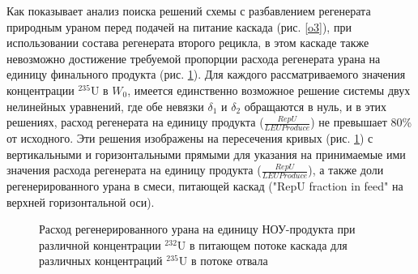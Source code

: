 Как показывает анализ поиска решений схемы с разбавлением регенерата природным ураном перед подачей на питание каскада (рис. \ref{o3}), при использовании состава регенерата второго рецикла, в этом каскаде также невозможно достижение требуемой пропорции расхода регенерата урана на единицу финального продукта (рис. \ref{sc3_1.second}). Для каждого рассматриваемого значения концентрации $^{235}$U в $W_0$, имеется единственно возможное решение системы двух нелинейных уравнений, где обе невязки $\delta_1$ и $\delta_2$  обращаются в нуль, и в этих решениях, расход регенерата на единицу продукта ($\frac{RepU}{LEU Produce}$) не превышает 80\% от исходного. Эти решения изображены на пересечения кривых (рис. \ref{sc3_1.second}) с вертикальными и горизонтальными прямыми для указания на принимаемые ими значения расхода регенерата на единицу продукта ($\frac{RepU}{LEU Produce}$), а также доли регенерированного урана в смеси, питающей каскад ("RepU fraction in feed" на верхней горизонтальной оси).


\begin{figure}[ht]
  \caption{Расход регенерированного урана на единицу НОУ-продукта  при различной концентрации $^{232}$U в питающем потоке каскада для различных концентраций $^{235}$U в потоке отвала}\label{sc3_1.second}
\end{figure}




